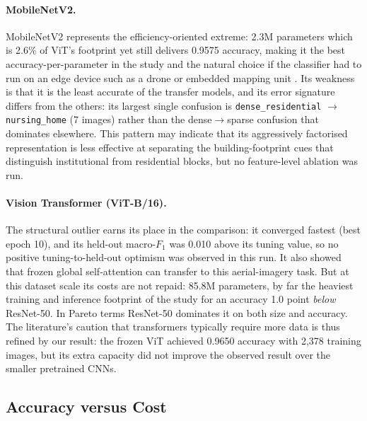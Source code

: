 \documentclass[11pt,twoside,a4paper]{article}
\begin{document}
\paragraph{MobileNetV2.}
MobileNetV2 represents the efficiency-oriented extreme: 2.3M parameters which is
2.6\% of ViT's footprint yet
still delivers 0.9575 accuracy, making it the best accuracy-per-parameter in
the study and the natural choice if the classifier had to run on an edge
device such as a drone or embedded mapping unit \cite{Sandler2018}. Its
weakness is that it is the least accurate of the transfer models, and its
error signature differs from the others: its largest single confusion is
\texttt{dense\_residential} $\rightarrow$ \texttt{nursing\_home} (7 images)
rather than the dense$\rightarrow$sparse confusion that dominates elsewhere.
This pattern may indicate that its aggressively factorised representation is
less effective at separating the building-footprint cues that distinguish
institutional from residential blocks, but no feature-level ablation was run.

\paragraph{Vision Transformer (ViT-B/16).}
The structural outlier earns its place in the comparison: it converged
fastest (best epoch 10), and its held-out macro-$F_1$ was 0.010 above its
tuning value, so no positive tuning-to-held-out optimism was observed in this
run. It also showed that frozen global self-attention can transfer to this
aerial-imagery task. But at this dataset scale its costs are not repaid: 85.8M
parameters, by far the heaviest training and inference footprint of the
study for an accuracy 1.0 point \emph{below} ResNet-50. In Pareto terms
ResNet-50 dominates it on both size and accuracy. The literature's caution
that transformers typically require more data
\cite{Shoaib2025} is thus refined by our result: the frozen ViT achieved 0.9650
accuracy with 2,378 training images, but its extra capacity did not improve the
observed result over the smaller pretrained CNNs.

\subsection{Accuracy versus Cost}
\end{document}
